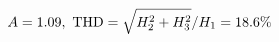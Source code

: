 \documentclass[preview]{standalone}
\begin{document}
\begin{align*}
\special{dvisvgm:raw <g id='unique000'>}A=1.09,\ \text{THD}=\sqrt{H_2^2+H_3^2}/H_1=18.6\%\special{dvisvgm:raw </g>}
\end{align*}
\end{document}
